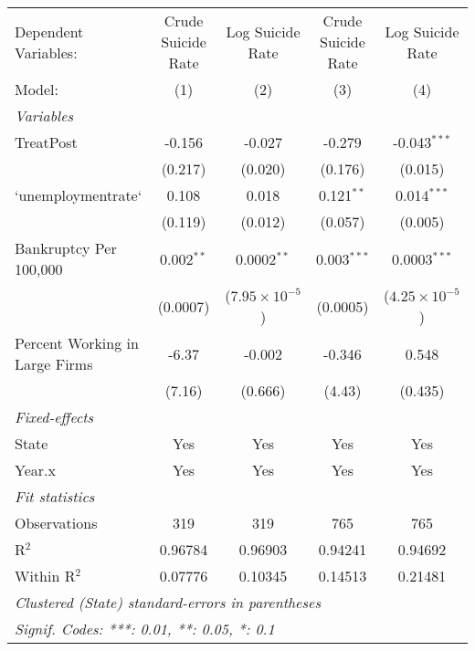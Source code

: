 
\centering
\begin{tabular}{lcccc}
   \tabularnewline \midrule \midrule
   Dependent Variables:           & Crude Suicide Rate & Log Suicide Rate        & Crude Suicide Rate & Log Suicide Rate\\  
   Model:                         & (1)                & (2)                     & (3)                & (4)\\  
   \midrule
   \emph{Variables}\\
   TreatPost                      & -0.156             & -0.027                  & -0.279             & -0.043$^{***}$\\   
                                  & (0.217)            & (0.020)                 & (0.176)            & (0.015)\\   
   `unemploymentrate`             & 0.108              & 0.018                   & 0.121$^{**}$       & 0.014$^{***}$\\   
                                  & (0.119)            & (0.012)                 & (0.057)            & (0.005)\\   
   Bankruptcy Per 100,000         & 0.002$^{**}$       & 0.0002$^{**}$           & 0.003$^{***}$      & 0.0003$^{***}$\\   
                                  & (0.0007)           & ($7.95\times 10^{-5}$)  & (0.0005)           & ($4.25\times 10^{-5}$)\\    
   Percent Working in Large Firms & -6.37              & -0.002                  & -0.346             & 0.548\\   
                                  & (7.16)             & (0.666)                 & (4.43)             & (0.435)\\   
   \midrule
   \emph{Fixed-effects}\\
   State                          & Yes                & Yes                     & Yes                & Yes\\  
   Year.x                         & Yes                & Yes                     & Yes                & Yes\\  
   \midrule
   \emph{Fit statistics}\\
   Observations                   & 319                & 319                     & 765                & 765\\  
   R$^2$                          & 0.96784            & 0.96903                 & 0.94241            & 0.94692\\  
   Within R$^2$                   & 0.07776            & 0.10345                 & 0.14513            & 0.21481\\  
   \midrule \midrule
   \multicolumn{5}{l}{\emph{Clustered (State) standard-errors in parentheses}}\\
   \multicolumn{5}{l}{\emph{Signif. Codes: ***: 0.01, **: 0.05, *: 0.1}}\\
\end{tabular}




